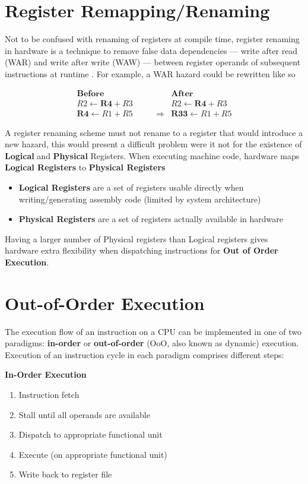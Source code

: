 \documentclass[12pt]{report}
\begin{document}
\section{Register Remapping/Renaming}
\label{sec:org370529e}
Not to be confused with renaming of registers at compile time, register
renaming in hardware is a technique to remove false data dependencies ---
write after read (WAR) and write after write (WAW) --- between register
operands of subsequent instructions at runtime \parencite{sima2000design}.
For example, a WAR hazard could be rewritten like so

\begin{align*}
\textbf{Before}                   & \qquad &                 \textbf{After} \\
R2 \leftarrow \textbf{R4} + R3    & \qquad &                 R2 \leftarrow \textbf{R4} + R3 \\
\textbf{R4} \leftarrow R1 + R5    & \qquad \Longrightarrow & \textbf{R33} \leftarrow R1 + R5
\end{align*}

A register renaming scheme must not rename to a register that would introduce
a new hazard, this would present a difficult problem were it not for the
existence of \textbf{Logical} and \textbf{Physical} Registers. When executing machine code,
hardware maps \textbf{Logical Registers} to \textbf{Physical Registers}
\begin{itemize}
\item \textbf{Logical Registers} are a set of registers usable directly when
writing/generating assembly code (limited by system architecture)
\item \textbf{Physical Registers} are a set of registers actually available in hardware
\end{itemize}
Having a larger number of Physical registers than Logical registers gives
hardware extra flexibility when dispatching instructions for \textbf{Out of Order Execution}.

\section{Out-of-Order Execution}
\label{sec:orgbf33804}

The execution flow of an instruction on a CPU can be implemented in one of
two paradigms: \textbf{in-order} or \textbf{out-of-order} (OoO, also known as dynamic)
execution. Execution of an instruction cycle in each paradigm comprises
different steps:

\textbf{In-Order Execution}
\begin{enumerate}
\item Instruction fetch
\item Stall until all operands are available
\item Dispatch to appropriate functional unit
\item Execute (on appropriate functional unit)
\item Write back to register file
\end{enumerate}
\end{document}
